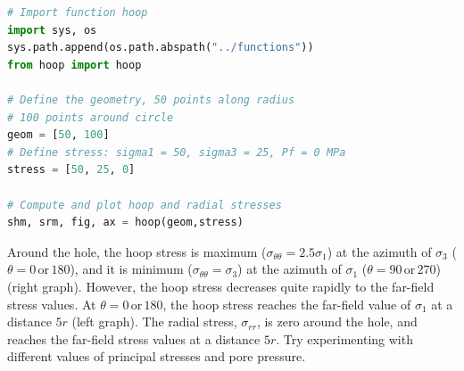 \documentclass[a4paper , 12pt]{book}
\begin{document}
\begin{center}
\begin{lstlisting}[language=Python, frame=single]
# Import function hoop
import sys, os
sys.path.append(os.path.abspath("../functions"))
from hoop import hoop

# Define the geometry, 50 points along radius
# 100 points around circle
geom = [50, 100]
# Define stress: sigma1 = 50, sigma3 = 25, Pf = 0 MPa 
stress = [50, 25, 0]

# Compute and plot hoop and radial stresses
shm, srm, fig, ax = hoop(geom,stress)
\end{lstlisting}
\end{center}

Around the hole, the hoop stress is maximum ($\sigma_{\theta\theta}=2.5\sigma_1$) at the azimuth of $\sigma_3$ ($\theta=0\,\textrm{or}\, 180$\degree), and it is minimum ($\sigma_{\theta\theta}=\sigma_3$) at the azimuth of $\sigma_1$ ($\theta=90\,\textrm{or}\, 270$\degree) (right graph). However, the hoop stress decreases quite rapidly to the far-field stress values. At $\theta=0\,\textrm{or}\, 180$\degree, the hoop stress reaches the far-field value of $\sigma_1$ at a distance $5r$ (left graph). The radial stress, $\sigma_{rr}$, is zero around the hole, and reaches the far-field stress values at a distance $5r$. Try experimenting with different values of principal stresses and pore pressure.
\end{document}

